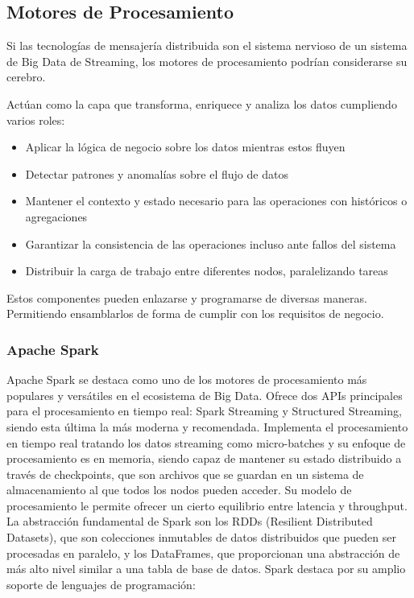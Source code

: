 \subsection{Motores de Procesamiento}

Si las tecnologías de mensajería distribuida son el sistema nervioso de un sistema de Big Data de Streaming, 
los motores de procesamiento podrían considerarse su cerebro.

Actúan como la capa que transforma, enriquece y analiza los datos cumpliendo varios roles:
\begin{itemize}
    \item Aplicar la lógica de negocio sobre los datos mientras estos fluyen
    \item Detectar patrones y anomalías sobre el flujo de datos
    \item Mantener el contexto y estado necesario para las operaciones con históricos o agregaciones
    \item Garantizar la consistencia de las operaciones incluso ante fallos del sistema
    \item Distribuir la carga de trabajo entre diferentes nodos, paralelizando tareas
\end{itemize}

Estos componentes pueden enlazarse y programarse de diversas maneras. Permitiendo ensamblarlos de forma de cumplir 
con los requisitos de negocio.
\newpage
\subsubsection{Apache Spark}

Apache Spark se destaca como uno de los motores de procesamiento más populares y versátiles en el ecosistema de Big Data.
Ofrece dos APIs principales para el procesamiento en tiempo real: Spark Streaming y Structured Streaming,
siendo esta última la más moderna y recomendada. Implementa el procesamiento en tiempo real tratando los datos streaming
como micro-batches y su enfoque de procesamiento es en memoria, siendo capaz de mantener su estado distribuido a través
de checkpoints, que son archivos que se guardan en un sistema de almacenamiento al que todos los nodos pueden acceder.
Su modelo de procesamiento le permite ofrecer un cierto equilibrio entre latencia y throughput. La abstracción fundamental
de Spark son los RDDs (Resilient Distributed Datasets), que son colecciones inmutables de datos distribuidos que pueden
ser procesadas en paralelo, y los DataFrames, que proporcionan una abstracción de más alto nivel similar a una tabla de
base de datos.
Spark destaca por su amplio soporte de lenguajes de programación:

